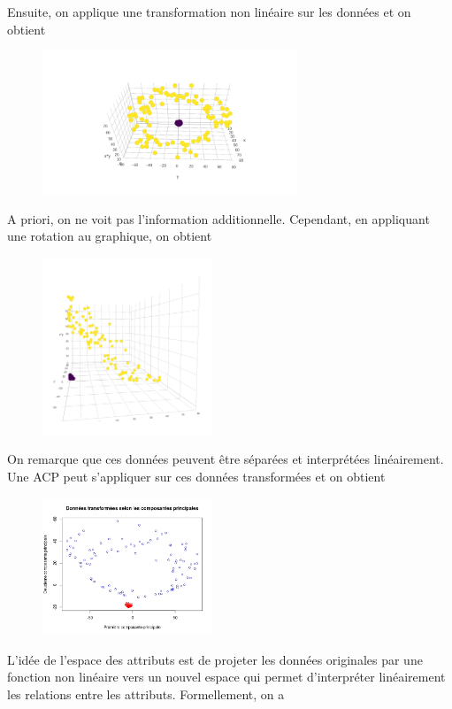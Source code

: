 Ensuite, on applique une transformation non linéaire sur les données et on obtient 

\begin{figure}[H]
	\centering
	\includegraphics[width=3in]{exemple_1_2d}
\end{figure}

A priori, on ne voit pas l'information additionnelle. Cependant, en appliquant une rotation au graphique, on obtient

\begin{figure}[H]
	\centering 
	\includegraphics[width=2in]{exemple_1_3d}
\end{figure}

On remarque que ces données peuvent être séparées et interprétées linéairement. Une ACP peut s'appliquer sur ces données transformées et on obtient 

\begin{figure}[H]
	\centering
	\includegraphics[width=2in]{exemple_1_pca}
\end{figure}

L'idée de l'espace des attributs est de projeter les données originales par une fonction non linéaire vers un nouvel espace qui permet d'interpréter linéairement les relations entre les attributs. Formellement, on a 

